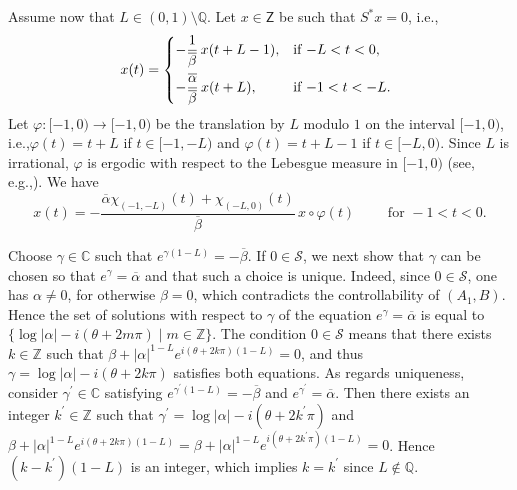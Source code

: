 \documentclass[10pt]{article}
\newcommand{\ie}{i.e.,\xspace}
\newcommand{\eg}{e.g.,\xspace}
\renewcommand{\eg}{e.g.,\xspace}
\theoremstyle{plain}
\theoremstyle{definition}
\newcommand{\abs}[1]{\left\lvert #1\right \rvert}
\numberwithin{equation}{section}\numberwithin{figure}{section}\emergencystretch=3em
\begin{document}
Assume now that $L \in (0, 1) \setminus \mathbb Q$. Let $x \in \mathsf Z$ be such that $S^\ast x = 0$, \ie 
\[
x(t) =
\begin{dcases*}
-\frac{1}{\overline\beta}\, x(t + L - 1), & if $-L < t < 0$, \\
-\frac{\overline\alpha}{\overline\beta}\, x(t + L), & if $-1 < t < -L$.
\end{dcases*}
\]
Let $\varphi: [-1, 0) \to [-1, 0)$ be the translation by $L$ modulo $1$ on the interval $[-1, 0)$, \ie $\varphi(t) = t + L$ if $t \in [-1, -L)$ and $\varphi(t) = t + L - 1$ if $t \in [-L, 0)$. Since $L$ is irrational, $\varphi$ is ergodic with respect to the Lebesgue measure in $[-1, 0)$ (see, \eg \cite[Chap.\,II, Th.\,3.2]{Mane1987Ergodic}). We have
\[
x(t) = -\frac{\overline\alpha \chi_{(-1, -L)}(t) + \chi_{(-L, 0)}(t)}{\overline\beta}\, x \circ \varphi(t) \qquad \text{ for } -1 < t < 0.
\]

Choose $\gamma \in \mathbb C$ such that $e^{\gamma (1 - L)} = -\overline\beta$. If $0 \in \mathcal S$, we next show that $\gamma$ can be chosen so that $e^{\gamma} = \overline\alpha$ and that such a choice is unique. Indeed, since $0 \in \mathcal S$, one has $\alpha \neq 0$, for otherwise $\beta = 0$, which contradicts the controllability of $(A_1, B)$. Hence the set of solutions with respect to $\gamma$ of the equation $e^{\gamma} = \overline\alpha$ is equal to $\{\log \abs{\alpha} - i (\theta + 2 m \pi) \mid m \in \mathbb Z\}$. The condition $0 \in \mathcal S$ means that there exists $k \in \mathbb Z$ such that $\beta + \abs{\alpha}^{1 - L} e^{i (\theta + 2 k \pi)(1 - L)} = 0$, and thus $\gamma = \log \abs{\alpha} - i (\theta + 2 k \pi)$ satisfies both equations. As regards uniqueness, consider $\gamma^\prime \in \mathbb C$ satisfying $e^{\gamma^\prime (1 - L)} = -\overline\beta$ and $e^{\gamma^\prime} = \overline\alpha$. Then there exists an integer $k^\prime \in \mathbb Z$ such that $\gamma^\prime = \log \abs{\alpha} - i (\theta + 2 k^\prime \pi)$ and $\beta + \abs{\alpha}^{1 - L} e^{i (\theta + 2 k \pi)(1 - L)} = \beta + \abs{\alpha}^{1 - L} e^{i (\theta + 2 k^\prime \pi)(1 - L)} = 0$. Hence $(k - k^\prime)(1 - L)$ is an integer, which implies $k = k^\prime$ since $L \notin \mathbb Q$.
\end{document}
